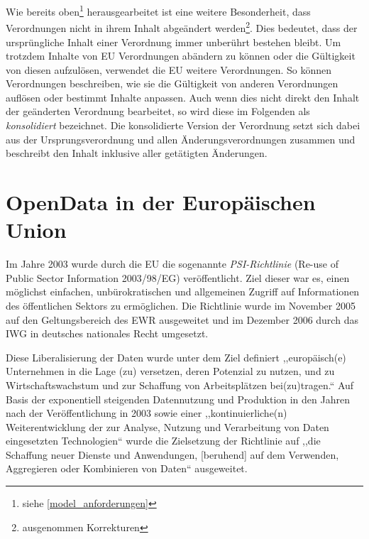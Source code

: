 Wie bereits oben\footnote{siehe \ref{model_anforderungen}} herausgearbeitet ist eine weitere Besonderheit, dass Verordnungen nicht in ihrem Inhalt abgeändert werden\footnote{ausgenommen Korrekturen}.
Dies bedeutet, dass der ursprüngliche Inhalt einer Verordnung immer unberührt bestehen bleibt.
Um trotzdem Inhalte von \ac{EU} Verordnungen abändern zu können oder die Gültigkeit von diesen aufzulösen, verwendet die \ac{EU} weitere Verordnungen.
So können Verordnungen beschreiben, wie sie die Gültigkeit von anderen Verordnungen auflösen oder bestimmt Inhalte anpassen.
Auch wenn dies nicht direkt den Inhalt der geänderten Verordnung bearbeitet, so wird diese im Folgenden als \textit{konsolidiert} bezeichnet.
Die konsolidierte Version der Verordnung setzt sich dabei aus der Ursprungsverordnung und allen Änderungsverordnungen zusammen und beschreibt den Inhalt inklusive aller getätigten Änderungen.


    \section{OpenData in der Europäischen Union}

Im Jahre 2003 wurde durch die EU die sogenannte \textit{PSI-Richtlinie} (Re-use of Public Sector Information 2003/98/EG) veröffentlicht.
Ziel dieser war es, einen möglichst einfachen, unbürokratischen und allgemeinen Zugriff auf Informationen des öffentlichen Sektors zu ermöglichen.
Die Richtlinie wurde im November 2005 auf den Geltungsbereich des EWR ausgeweitet\cite{2005D0105} und im Dezember 2006 durch das \ac{IWG} in deutsches nationales Recht umgesetzt.

\medskip
Diese Liberalisierung der Daten wurde unter dem Ziel definiert ,,europäisch(e) Unternehmen in die Lage (zu) versetzen, deren Potenzial zu nutzen, und zu Wirtschaftswachstum und zur Schaffung von Arbeitsplätzen bei(zu)tragen.``\cite[ErwG. 5]{2003L0098} 
Auf Basis der exponentiell steigenden Datennutzung und Produktion in den Jahren nach der Veröffentlichung in 2003 sowie einer ,,kontinuierliche(n) Weiterentwicklung der zur Analyse, Nutzung und Verarbeitung von Daten eingesetzten Technologien``\cite[ErwG. 5]{2013L0037} wurde die Zielsetzung der Richtlinie auf ,,die Schaffung neuer Dienste und Anwendungen, [beruhend] auf dem Verwenden, Aggregieren oder Kombinieren von Daten``\cite[ErwG. 5]{2013L0037} ausgeweitet. 

